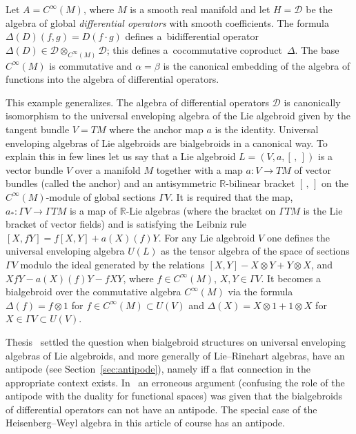 \documentclass[pdftex]{sigma}
\numberwithin{equation}{section}
\begin{document}
\begin{Example}\label{ex:basic} Let $A = C^\infty(M)$, where $M$ is a smooth real manifold and let $H=\mathcal{D}$ be the algebra of global {\it differential operators} with smooth coefficients. The formula $\Delta(D)(f,g) = D(f\cdot g)$ defines a~bidifferential operator $\Delta(D)\in\mathcal{D}\otimes_{C^\infty(M)}\mathcal{D}$; this defines a~cocommutative coproduct~$\Delta$. The base $C^\infty(M)$ is commutative and $\alpha = \beta$ is the canonical embedding of the algebra of functions into the algebra of differential operators.

This example generalizes. The algebra of differential operators $\mathcal{D}$ is canonically isomorphism to the universal enveloping algebra of the Lie algebroid given by the tangent bundle $V = T M$ where the anchor map $a$ is the identity. Universal enveloping algebras of Lie algebroids are bialgebroids in a canonical way. To explain this in few lines let us say that a Lie algebroid $L = (V,a,[\,,\,])$ is a vector bundle $V$ over a manifold $M$ together with a map $a\colon V\to T M$ of vector bundles (called the anchor) and an antisymmetric $\mathbb{R}$-bilinear bracket $[\,,\,]$ on the $C^\infty(M)$-module of global sections $\Gamma V$. It is required that the map, $a_*\colon \Gamma V\to\Gamma T M$ is a map of $\mathbb{R}$-Lie algebras (where the bracket on $\Gamma T M$ is the Lie bracket of vector fields) and is satisfying the Leibniz rule $[X,f Y] = f [X,Y] + a(X)(f)Y$.
For any Lie algebroid $V$ one defines the universal enveloping algebra $U(L)$ as the tensor algebra of the space of sections $\Gamma V$ modulo the ideal generated by the relations $[X,Y] - X\otimes Y + Y\otimes X$, and $X f Y - a(X)(f)Y - f X Y$, where $f\in C^\infty(M)$, $X,Y\in\Gamma V$. It becomes a bialgebroid over the commutative algebra $C^\infty(M)$ via the formula $\Delta(f) = f\otimes 1$ for $f\in C^\infty(M)\subset U(V)$ and $\Delta(X) = X\otimes 1 + 1\otimes X$ for $X\in\Gamma V\subset U(V)$.

Thesis~\cite{kowalzig} settled the question when bialgebroid structures on universal enveloping algebras of Lie algebroids, and more generally of Lie--Rinehart algebras, have an antipode (see Section~\ref{sec:antipode}), namely iff a flat connection in the appropriate context exists. In~\cite{xu} an erroneous argument (confusing the role of the antipode with the duality for functional spaces) was given that the bialgebroids of differential operators can not have an antipode. The special case of the Heisenberg--Weyl algebra in this article of course has an antipode.
\end{Example}
\end{document}
